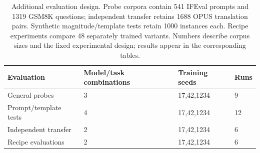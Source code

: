 \begin{table}[t]
\centering\small
\begin{tabular}{llll}
\toprule
Evaluation & Model/task combinations & Training seeds & Runs \\
\midrule
General probes & 3 & 17,42,1234 & 9 \\
Prompt/template tests & 4 & 17,42,1234 & 12 \\
Independent transfer & 2 & 17,42,1234 & 6 \\
Recipe evaluations & 2 & 17,42,1234 & 6 \\
\bottomrule
\end{tabular}
\caption{Additional evaluation design. Probe corpora contain 541 IFEval prompts and 1319 GSM8K questions; independent transfer retains 1688 OPUS translation pairs. Synthetic magnitude/template tests retain 1000 instances each. Recipe experiments compare 48 separately trained variants. Numbers describe corpus sizes and the fixed experimental design; results appear in the corresponding tables.}
\label{tab:paper-finish-protocol}
\end{table}
